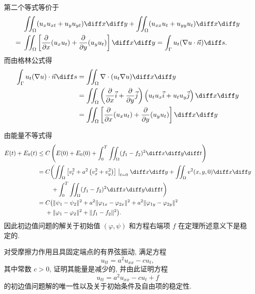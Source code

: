 \begin{note}[教材(6.15)式解释]
  第二个等式等价于
  \begin{align*}
        & \iint_{\Omega}(u_xu_{xt}+u_yu_{yt})\diff x\diff y
          +\iint_{\Omega}(u_{xx}u_t+u_{yy}u_t)\diff x\diff y \\
    ={} & \iint_{\Omega}\left[\frac{\partial}{\partial x}(u_xu_t)
          +\frac{\partial}{\partial y}(u_yu_t)\right]\diff x\diff y
          =\int_{\Gamma}u_t(\nabla u\cdot\vec{n})\diff s.
  \end{align*}
  而由格林公式得
  \[\begin{split}\int_{\Gamma}u_t(\nabla u)\cdot\vec{n}\diff s&=\iint_{\Omega}\nabla\cdot(u_t\nabla u)\diff x\diff y\\
  &=\iint_{\Omega}\left(\frac{\partial}{\partial x}\vec{i}+\frac{\partial}{\partial y}\vec{j}\right)\left(u_tu_x\vec{i}+u_tu_y\vec{j}\right)\diff x\diff y\\
  &=\iint_{\Omega}\left[\frac{\partial}{\partial x}(u_xu_t)+\frac{\partial}{\partial y}(u_yu_t)\right]\diff x\diff y\end{split}\]
\end{note}

\begin{note}[定理6.2]
  由能量不等式得
  \begin{align*}
    E(t)+E_0(t)
    \leq{} & C\left(E(0)+E_0(0)+\int_0^T
      \iint_{\Omega}(f_1-f_2)^2\diff x\diff y\diff t\right) \\
    ={} & C\biggl(\iint_{\Omega}\left[v_t^2+a^2\left(v_x^2+v_y^2\right)\right]\bigm|_{t=0}
          \diff x\diff y + \iint_{\Omega}v^2(x,y,0)\diff x\diff y \\
        & \quad + \int_0^T \iint_{\Omega}( f_1-f_2)^2\diff x\diff y\diff t\biggr) \\
    ={} & C\bigl(\|\psi_1-\psi_2\|^2+a^2\|\varphi_{1x}-\varphi_{2x}\|^2
          + a^2\|\varphi_{1y}-\varphi_{2y}\|^2 \\
        & + \|\varphi_1-\varphi_2\|^2+\|f_1-f_2\|^2\bigr).
  \end{align*}
  因此初边值问题的解关于初始值 $(\varphi,\psi)$ 和方程右端项 $f$ 在定理所述意义下是稳定的.
\end{note}


\begin{exercise}
  对受摩擦力作用且具固定端点的有界弦振动, 满足方程
  \[u_{tt} = a^2u_{xx} - cu_t,\]
  其中常数 $c>0$, 证明其能量是减少的, 并由此证明方程
  \[u_{tt} = a^2u_{xx} - cu_t + f\]
  的初边值问题解的唯一性以及关于初始条件及自由项的稳定性.
\end{exercise}

